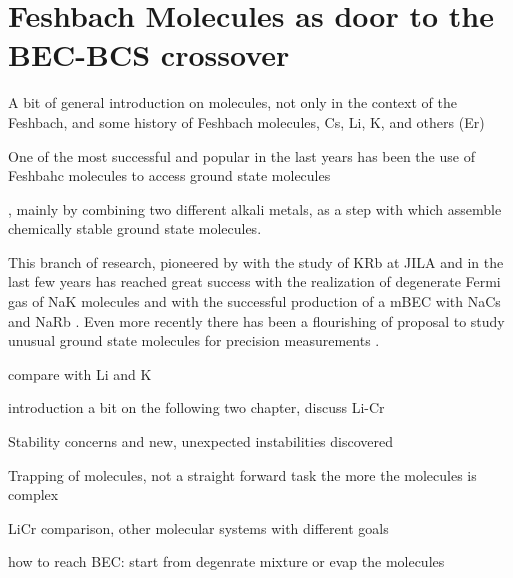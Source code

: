 \chapter{Feshbach Molecules as door to the BEC-BCS crossover}
\label{Chpt:FeshmolIntro}

A bit of general introduction on molecules, not only in the context of the Feshbach, and some history of Feshbach molecules, Cs, Li, K, and others (Er)

One of the most successful and popular in the last years has been the use of Feshbahc molecules to access ground state molecules

, mainly by combining two different alkali metals, as a step with which assemble chemically stable ground state molecules. 


This branch of research, pioneered by with the study of KRb at JILA and in the last few years has reached great success with the realization of degenerate Fermi gas of NaK molecules \cite{Schindewolf2022eom} and with the successful production of a \ac{mBEC} with NaCs \cite{Bigagli2024oob} and NaRb \cite{Shi2025bec}. Even more recently there has been a flourishing of proposal to study unusual ground state molecules for precision measurements \cite{Ciamei2026uhs}. 


compare with Li and K 

introduction a bit on the following two chapter, discuss Li-Cr
 
Stability concerns and new, unexpected instabilities discovered

Trapping of molecules, not a straight forward task the more the molecules is complex

LiCr comparison, other molecular systems with different goals


how to reach BEC: start from degenrate mixture or evap the molecules